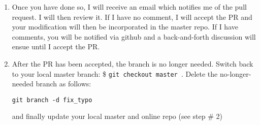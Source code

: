 \begin{enumerate}
\item Once you have done so, I will receive an email which notifies me of the pull request. I will 
then review it. If I have no comment, I will accept the PR and your modification will 
then be incorporated in the master repo. If I have comments, you will be notified via github and a 
back-and-forth discussion will ensue until I accept the PR. 

\item After the PR has been accepted, the branch is no longer needed. Switch back to your local master branch:
\$ \verb"git checkout master ". Delete the no-longer-needed branch as follows:
\begin{verbatim}
git branch -d fix_typo
\end{verbatim}
and finally update your local master and online repo (see step \# 2) 




\end{enumerate}
